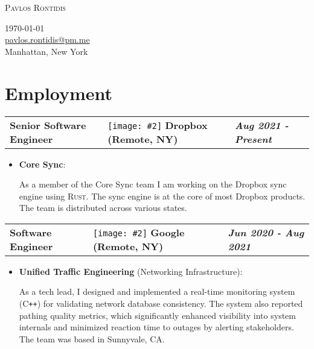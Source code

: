 \documentclass[a4paper,10pt]{article}
\newcommand*{\mahogany}{\textcolor{Mahogany}}
\newcommand{\jobtitle}[5]{
\vspace{0.1cm}
\begin{tabularx}
{\textwidth}
{ >{\raggedright\arraybackslash}p{6cm} 
  >{\raggedright\arraybackslash}X 
  >{\raggedleft\arraybackslash}p{4cm} }
\large\textbf{#1} & 
\texttt{[image: \#2]} \large\textbf{\mahogany{#3}} \normalsize\textbf{(#4)} & 
\textit{\large\textbf{#5}}
\end{tabularx}
\vspace{-0.4cm}
}
\begin{document}
\pagestyle{empty} %

\begin{minipage}{.45\linewidth}
\begin{flushleft}                           
\Huge \textsc{Pavlos Rontidis}
\end{flushleft} 
\end{minipage}
\hfill
\begin{minipage}{.45\linewidth}
\begin{flushright}   
\today\\
\href{mailto:pavlos.rontidis@pm.me}{pavlos.rontidis@pm.me}\\
Manhattan, New York
\end{flushright} 
\end{minipage}
\noindent\makebox[\linewidth]{\rule{\linewidth}{0.4pt}}

\section{Employment}
\jobtitle{Senior Software Engineer}{icons/dbx.png}{Dropbox}{Remote, NY}{Aug 2021 - Present}
\begin{itemize}[leftmargin=.27in,label=] \setlength\itemsep{-0.1cm}
	\item \textbf{Core Sync}:
    \vspace{-0.1cm}
    
    As a member of the Core Sync team I am working on the Dropbox sync engine using \textsc{Rust}. The sync engine is at the core of most Dropbox products. The team is distributed across various states.
\end{itemize}

\jobtitle{Software Engineer}{icons/google.png}{Google}{Remote, NY}{Jun 2020 - Aug 2021}
\begin{itemize}[leftmargin=.27in,label=] \setlength\itemsep{-0.1cm}
	\item \textbf{Unified Traffic Engineering} (Networking Infrastructure): 
	\vspace{-0.1cm}
	
    As a tech lead, I designed and implemented a real-time monitoring system \textsc{(C\texttt{++})}  for validating network database consistency. The system also reported pathing quality metrics, which significantly enhanced visibility into system internals and minimized reaction time to outages by alerting stakeholders. The team was based in Sunnyvale, CA.
\end{itemize}
\end{document}
